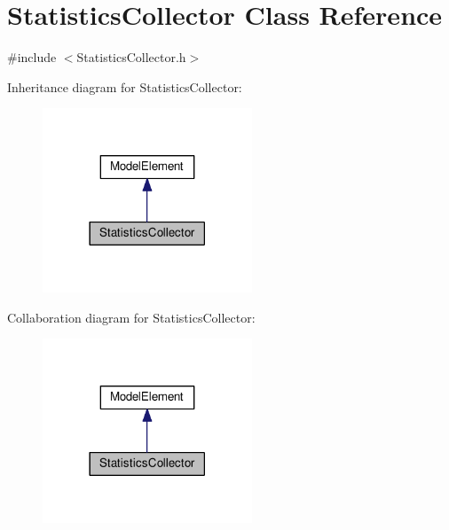 \hypertarget{class_statistics_collector}{}\section{Statistics\+Collector Class Reference}
\label{class_statistics_collector}


{\ttfamily \#include $<$Statistics\+Collector.\+h$>$}



Inheritance diagram for Statistics\+Collector\+:\nopagebreak
\begin{figure}[H]
\begin{center}
\leavevmode
\includegraphics[width=177pt]{class_statistics_collector__inherit__graph}
\end{center}
\end{figure}


Collaboration diagram for Statistics\+Collector\+:\nopagebreak
\begin{figure}[H]
\begin{center}
\leavevmode
\includegraphics[width=177pt]{class_statistics_collector__coll__graph}
\end{center}
\end{figure}
